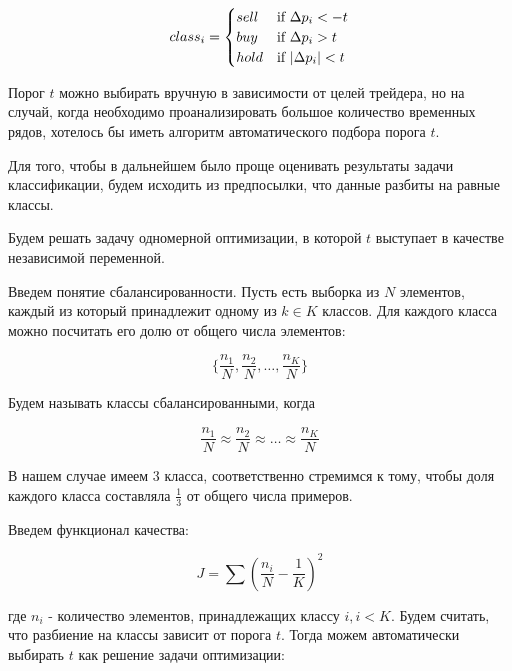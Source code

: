\documentclass[a4paper,article,14pt]{extarticle}
\begin{document}
\begin{equation}
class_i =
 \begin{cases}
     sell &\text{if $ \Delta  p_i < -t$}
     \\
     buy &\text{if $\Delta p_i > t$}
     \\
     hold &\text{if $|\Delta p_i| < t$}
 \end{cases}
\label{eq:equation3}
\end{equation}

Порог $t$ можно выбирать вручную в зависимости от целей трейдера, но на случай, когда необходимо проанализировать большое количество временных рядов, хотелось бы иметь алгоритм автоматического подбора порога $t$.
\par
Для того, чтобы в дальнейшем было проще оценивать результаты задачи классификации, будем исходить из предпосылки, что данные разбиты на равные классы.

Будем решать задачу одномерной оптимизации, в которой $t$ выступает в качестве независимой переменной.

Введем понятие сбалансированности.
Пусть есть выборка из $N$ элементов, каждый из который принадлежит одному из $k \in K$ классов.
Для каждого класса можно посчитать его долю от общего числа элементов:

\begin{equation}
    \{ \frac{n_1}{N}, \frac{n_2}{N}, \dots , \frac{n_K}{N} \}
    \label{eq:fractions}
\end{equation}

Будем называть классы сбалансированными, когда

\begin{equation}
    \frac{n_1}{N} \approx \frac{n_2}{N} \approx \dots \approx \frac{n_K}{N}
    \label{eq:balanced}
\end{equation}

В нашем случае имеем 3 класса, соответственно стремимся к тому, чтобы доля каждого класса составляла $\frac{1}{3}$ от общего числа примеров.

Введем функционал качества:

\begin{equation}
    J=\sum{(\frac{n_i}{N} - \frac{1}{K}) ^ 2}
    \label{eq:error_func}
\end{equation}

где $n_i$ - количество элементов, принадлежащих классу $i, i < K$.
Будем считать, что разбиение на классы зависит от порога $t$.
Тогда можем автоматически выбирать $t$ как решение задачи оптимизации:
\end{document}
